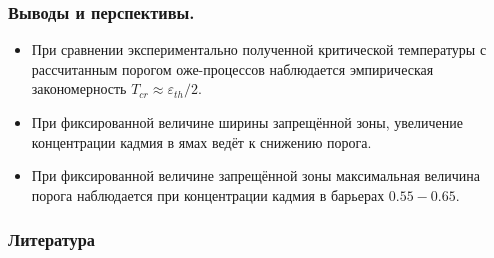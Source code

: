 \documentclass[9pt,pdf]{beamer}
\begin{document}
  \begin{frame}
    \frametitle{Выводы и перспективы.}
    \begin{itemize}
      \item При сравнении экспериментально полученной критической температуры 
        с рассчитанным порогом оже-процессов наблюдается эмпирическая 
        закономерность $T_{cr} \approx \varepsilon_{th} / 2$.
      \item При фиксированной величине ширины запрещённой зоны, увеличение 
        концентрации кадмия в ямах ведёт к снижению порога.
      \item При фиксированной величине запрещённой зоны максимальная величина
        порога наблюдается при концентрации кадмия в барьерах  $0.55-0.65$.
    \end{itemize}
  \end{frame}

  \begin{frame}[t, allowframebreaks]
    \frametitle{Литература}
    
    
  \end{frame}
\end{document}

